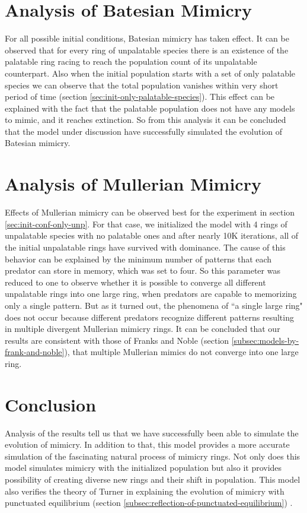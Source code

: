 \section{Analysis of Batesian Mimicry}
\label{sec:result-batesian-mimicry}
For all possible initial conditions, Batesian mimicry has taken effect. It can be observed that for every ring of unpalatable species there is an existence of the palatable ring racing to reach the population count of its unpalatable counterpart. Also when the initial population starts with a set of only palatable species we can observe that the total population vanishes within very short period of time (section \ref{sec:init-only-palatable-species}). This effect can be explained with the fact that the palatable population does not have any models to mimic, and it reaches extinction. So from this analysis it can be concluded that the model under discussion have successfully simulated the evolution of Batesian mimicry.

\section{Analysis of Mullerian Mimicry}
\label{sec:result-mullerian-mimicry}
Effects of Mullerian mimicry can be observed best for the experiment in section \ref{sec:init-conf-only-unp}. For that case, we initialized the model with 4 rings of unpalatable species with no palatable ones and after nearly 10K iterations, all of the initial unpalatable rings have survived with dominance. The cause of this behavior can be explained by the minimum number of patterns that each predator can store in memory, which was set to four. So this parameter was reduced to one to observe whether it is possible to converge all different unpalatable rings into one large ring, when predators are capable to memorizing only a single pattern. But as it turned out, the phenomena of ``a single large ring" does not occur because different predators recognize different patterns resulting in multiple divergent Mullerian mimicry rings. It can be concluded that our results are consistent with those of Franks and Noble (section \ref{subsec:models-by-frank-and-noble}), that multiple Mullerian mimics do not converge into one large ring.

\section{Conclusion}
\label{sec:result-conclusion}
Analysis of the results tell us that we have successfully been able to simulate the evolution of mimicry. In addition to that, this model provides a more accurate simulation of the fascinating natural process of mimicry rings. Not only does this model simulates mimicry with the initialized population but also it provides possibility of creating diverse new rings and their shift in population. This model also verifies the theory of Turner in explaining the evolution of mimicry with punctuated equilibrium (section \ref{subsec:reflection-of-punctuated-equilibrium}) \cite{turner1988}.